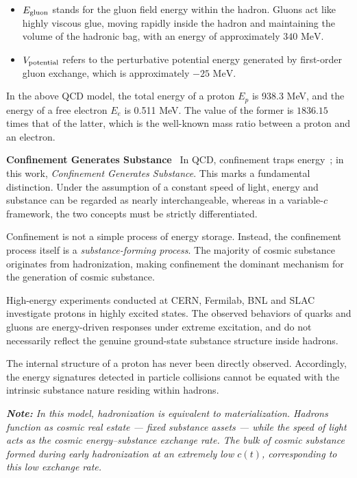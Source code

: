\documentclass[12pt,leqno]{article}
\begin{document}
{\begin{itemize}
		\item $E_{\rm gluon}$ stands for the gluon field energy within the hadron. Gluons act like highly viscous glue, moving rapidly inside the hadron and maintaining the volume of the hadronic bag, with an energy of approximately $340 \text{ MeV}$.
		
		\item $V_{\rm potential}$ refers to the perturbative potential energy generated by first-order gluon exchange, which is approximately $-25 \text{ MeV}$.
	\end{itemize}
	
	\medskip
	In the above QCD model, the total energy of a proton $E_{p}$ is 938.3 MeV, and the energy of a free electron $E_{e}$ is 0.511 MeV. The value of the former is $\boldsymbol{1836.15}$ times that of the latter, which is the well-known mass ratio between a proton and an electron.
	
	
	
	\medskip
	\bigskip
	\textbf{Confinement Generates Substance}\,\,\,
	In QCD, confinement traps energy~\cite{Peskin:1995}; in this work, \textit{Confinement Generates Substance}. This marks a fundamental distinction. Under the assumption of a constant speed of light, energy and substance can be regarded as nearly interchangeable, whereas in a variable-$c$ framework, the two concepts must be strictly differentiated.
	
	\medskip
	Confinement is not a simple process of energy storage. Instead, the confinement process itself is a \textit{substance-forming process}. The majority of cosmic substance originates from hadronization, making confinement the dominant mechanism for the generation of cosmic substance.
	
	\medskip
	High-energy experiments conducted at CERN, Fermilab, BNL and SLAC investigate protons in highly excited states. The observed behaviors of quarks and gluons are energy-driven responses under extreme excitation, and do not necessarily reflect the genuine ground-state substance structure inside hadrons.
	
	\medskip
	The internal structure of a proton has never been directly observed. Accordingly, the energy signatures detected in particle collisions cannot be equated with the intrinsic substance nature residing within hadrons.
	
	\medskip
	\textit{\textbf{Note:} In this model, hadronization is equivalent to materialization. Hadrons function as cosmic real estate — fixed substance assets — while the speed of light acts as the cosmic energy–substance exchange rate. The bulk of cosmic substance formed during early hadronization at an extremely low $c(t)$, corresponding to this low exchange rate.}
	
}
\end{document}
